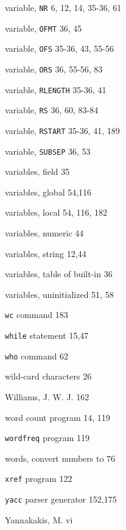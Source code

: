 \begin{multicols}{3}
variable, \verb'NR' 6, 12, 14, 35-36, 61

variable, \verb'OFMT' 36, 45

variable, \verb'OFS' 35-36, 43, 55-56

variable, \verb'ORS' 36, 55-56, 83

variable, \verb'RLENGTH' 35-36, 41

variable, \verb'RS' 36, 60, 83-84

variable, \verb'RSTART' 35-36, 41, 189

variable, \verb'SUBSEP' 36, 53

variables, field 35

variables, global 54,116

variables, local 54, 116, 182

variables, numeric 44

variables, string 12,44

variables, table of built-in 36

variables, uninitialized 51, 58

\verb'wc' command 183

\verb'while' statement 15,47

\verb'who' command 62

wild-card characters 26

Williams, J. W. J. 162

word count program 14, 119

\verb'wordfreq' program 119

words, convert numbers to 76

\verb'xref' program 122

\verb'yacc' parser generator 152,175

Yannakakis, M. vi

\end{multicols}
